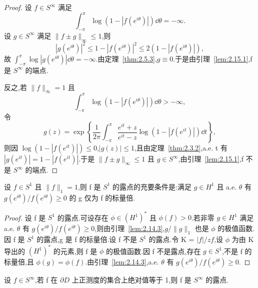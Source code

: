 \begin{proof}
设 $f \in S^{\infty}$ 满足
\begin{equation*}
\int_{-\pi}^{\pi} \log(1 - |f(e^{i\theta})|)\dd \theta = -\infty.
\end{equation*}
设 $g \in S^{\infty}$ 满足 $\|f \pm g\|_{\infty} \leq 1$,则
\begin{equation*}
|g(e^{i\theta})|^{2} \leq 1 - |f(e^{i\theta})|^{2} \leq 2(1 - |f(e^{i\theta})|),
\end{equation*}
故 $\int_{-\pi}^{\pi} \log|g(e^{i\theta})|\dd \theta = -\infty$.由定理~\ref{thm:2.5.3},$g \equiv 0$.于是由引理~\ref{lem:2.15.1},f 是 $S^{\infty}$ 的端点.

反之,若 $\|f\|_{\infty} = 1$ 且
\begin{equation*}
\int_{-\pi}^{\pi} \log(1 - |f(e^{i\theta})|)\dd \theta > -\infty,
\end{equation*}
令
\begin{equation*}
g(z) = \exp\left\{\frac{1}{2\pi}\int_{-\pi}^{\pi} \frac{e^{it} + z}{e^{it} - z}\log(1 - |f(e^{it})|)\dd t\right\},
\end{equation*}
则因 $\log(1 - |f(e^{it})|) \leq 0$,$|g(z)| \leq 1$,且由定理~\ref{thm:2.3.2},a.e. t 有 $|g(e^{it})| = 1 - |f(e^{it})|$.于是 $\|f \pm g\|_{\infty} \leq 1$ 且 $g \in S^{\infty}$,由引理~\ref{lem:2.15.1},f 不是 $S^{\infty}$ 的端点.
\end{proof}

\begin{proposition}\label{prop:2.15.5}
设 $f \in S^{1}$ 且 $\|f\|_{1} = 1$,则 f 是 $S^{1}$ 的露点的充要条件是:满足 $g \in H^{1}$ 且 a.e. $\theta$ 有 $g(e^{i\theta})/f(e^{i\theta}) \geq 0$ 的 g 仅为 f 的标量倍.
\end{proposition}

\begin{proof}
设 f 是 $S^{1}$ 的露点.可设存在 $\phi \in (H^{1})^{*}$ 且 $\phi(f) > 0$.若非零 $g \in H^{1}$ 满足 a.e. $\theta$ 有 $g(e^{i\theta})/f(e^{i\theta}) \geq 0$,则由引理~\ref{lem:2.14.3},$g/\|g\|_{1}$ 也是 $\phi$ 的极值函数.因 f 是 $S^{1}$ 的露点,g 是 f 的标量倍.设 f 不是 $S^{1}$ 的露点.令 K = $|f|/zf$,设 $\phi$ 为由 K 导出的 $(H^{1})^{*}$ 的元素,则 f 是 $\phi$ 的极值函数.因 f 不是露点,存在 $g \in S^{1}$,不是 f 的标量倍,且 $\phi(g) = \phi(f)$.由引理~\ref{lem:2.14.3},a.e. $\theta$ 有 $g(e^{i\theta})/f(e^{i\theta}) \geq 0$.
\end{proof}

\begin{proposition}\label{prop:2.15.6}
设 $f \in S^{\infty}$,若 f 在 $\partial D$ 上正测度的集合上绝对值等于 1,则 f 是 $S^{\infty}$ 的露点.
\end{proposition}

